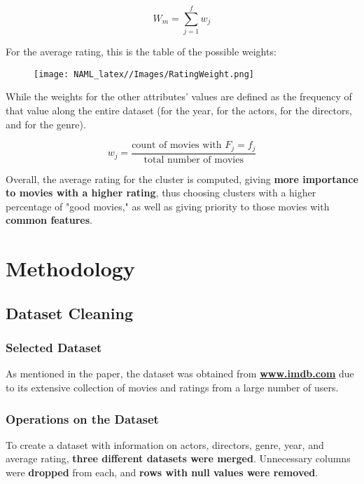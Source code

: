 \documentclass{Configuration_Files/Template}
\begin{document}
\begin{equation}
    W_m = \sum_{j=1}^{f} w_j
\end{equation}

For the average rating, this is the table of the possible weights:

\begin{figure}[H]
    \centering
    \texttt{[image: NAML\_latex//Images/RatingWeight.png]}
\end{figure}

While the weights for the other attributes' values are defined as the frequency of that value along the entire dataset (for the year, for the actors, for the directors, and for the genre).

\begin{equation}
    w_j = \frac{\text{count of movies with } F_j = f_j}{\text{total number of movies}}
\end{equation}

Overall, the average rating for the cluster is computed, giving \textbf{more importance to movies with a higher rating}, thus choosing clusters with a higher percentage of "good movies," as well as giving priority to those movies with \textbf{common features}.


\chapter{Methodology}

\section{Dataset Cleaning}

\subsection{Selected Dataset}

As mentioned in the paper, the dataset was obtained from \textbf{\href{www.imdb.com}{www.imdb.com}} due to its extensive collection of movies and ratings from a large number of users.

\subsection{Operations on the Dataset}

To create a dataset with information on actors, directors, genre, year, and average rating, \textbf{three different datasets were merged}. Unnecessary columns were \textbf{dropped} from each, and \textbf{rows with null values were removed}.
\end{document}

